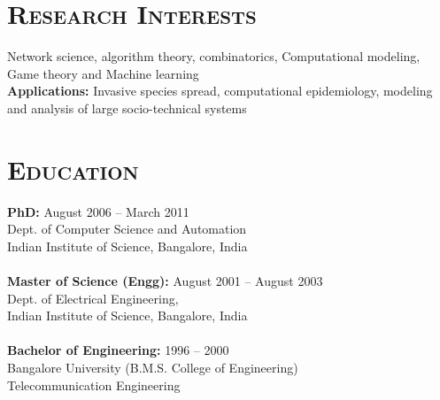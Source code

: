\documentclass[10pt]{article} %
\begin{document}
\begin{resume}
\section{\textnormal{\textsc{Research Interests}}}
Network science, algorithm theory, combinatorics,
Computational modeling, 
Game theory and Machine learning\\
{\bf Applications:} Invasive species spread, computational
epidemiology, modeling and analysis of large socio-technical systems
\section{\textnormal{\textsc{Education}}}
\textbf{PhD:} \hfill August 2006 -- March 2011\\
Dept. of Computer Science and Automation\\
Indian Institute of Science, Bangalore, India\\ 
~\\
\noindent\textbf{Master of Science (Engg):} \hfill August 2001 -- August 2003\\
Dept. of Electrical Engineering,\\
Indian Institute of Science, Bangalore, India\\
~\\
\noindent\textbf{Bachelor of Engineering:} \hfill 1996 -- 2000\\
Bangalore University (B.M.S. College of Engineering)\\
Telecommunication Engineering

\end{resume}
\end{document}
